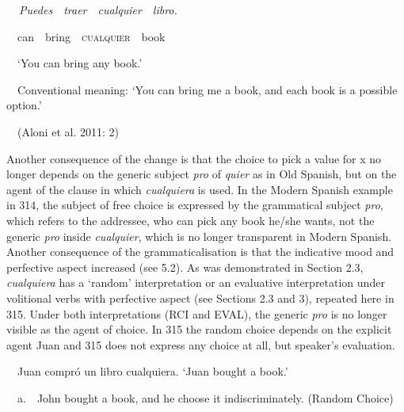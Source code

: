 \begin{styleStandard}
\textbf{\ \ }\textit{Puedes}\ \ \textit{traer}\ \ \textit{cualquier}\ \ \textit{libro.}\ \ \ \ 
\end{styleStandard}

\begin{styleStandard}
\ \ can\ \ bring\ \ \textsc{cualquier}\ \ book\ \ \ \ 
\end{styleStandard}

\begin{styleStandard}
\ \ ‘You can bring any book.’
\end{styleStandard}

\begin{styleStandard}
\ \ Conventional meaning: ‘You can bring me a book, and each book is a possible option.’
\end{styleStandard}

\begin{styleStandard}
\ \ (Aloni et al. 2011: 2)
\end{styleStandard}

\begin{styleStandard}
Another consequence of the change is that the choice to pick a value for x no longer depends on the generic subject \textit{pro} of \textit{quier }as in Old Spanish, but on the agent of the clause in which \textit{cualquiera} is used. In the Modern Spanish example in 314, the subject of free choice is expressed by the grammatical subject \textit{pro}, which refers to the addressee, who can pick any book he/she wants, not the generic \textit{pro} inside \textit{cualquier}, which is no longer transparent in Modern Spanish. Another consequence of the grammaticalisation is that the indicative mood and perfective aspect increased (see 5.2). As was demonstrated in Section 2.3, \textit{cualquiera} has a ‘random’ interpretation or an evaluative interpretation under volitional verbs with perfective aspect (see Sections 2.3 and 3), repeated here in 315. Under both interpretations (RCI and EVAL), the generic \textit{pro} is no longer visible as the agent of choice. In 315 the random choice depends on the explicit agent Juan and 315 does not express any choice at all, but speaker’s evaluation.
\end{styleStandard}

\begin{styleStandard}
\ \ Juan compró un libro cualquiera. ‘Juan bought a book.’
\end{styleStandard}

\begin{styleStandard}
\ \ a.\ \ John bought a book, and he choose it indiscriminately. (Random Choice)
\end{styleStandard}

